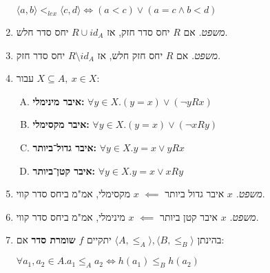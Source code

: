 \documentclass[]{article}
\newcommand\ra    {\rangle}
\newcommand\la    {\langle}
\newcommand\lex   {<_{lex}}
\newcommand\tho       {\textit{משפט. }}
\begin{document}
\begin{multicols}{2}
\begin{enumerate}[resume]
				\hfill $\la a, b \ra \lex \la c, d \ra \iff (a < c) \lor (a = c \land b < d)$
			\item \tho אם $R$ יחס סדר חזק, אז $R \cup id_A$ יחס סדר חלש. 
			\item \tho אם $R$ יחס חזק חלש, אז $R \setminus id_A$ יחס סדר חזק. 
			\item עבור $X \subseteq A, \ x \in X$: 
			\begin{enumerate}[A)]
				\item \textbf{איבר מינימלי: }\hfill $\forall y \in X. (y = x)\lor(\lnot yRx)$
				\item \textbf{איבר מקסימלי: }\hfill $\forall y \in X. (y = x)\lor(\lnot xRy)$
				\item \textbf{איבר גדול־ביותר: }\hfill $\forall y \in X. y = x \lor yRx$
				\item \textbf{איבר קטן־ביותר: }\hfill $\forall y \in X. y = x \lor xRy$
			\end{enumerate}
			\item \tho $x$ איבר גדול ביותר $\impliedby$ $x$ מקסימלי, אמ"מ ביחס סדר קווי. 
			\item \tho $x$ איבר קטן ביותר $\impliedby$ $x$ מינימלי, אמ"מ ביחס סדר קווי.  
			\item בהינתן $\la A, \le_A \ra, \la B, \le_B \ra$ יתקיים $f$ \textbf{שומרת סדר} אם: 
				
				\hfill $ \forall a_1, a_2 \in A. a_1 \le_A a_2 \iff h(a_1) \le_B h(a_2) $
		\end{enumerate}

\end{multicols}
\end{document}

